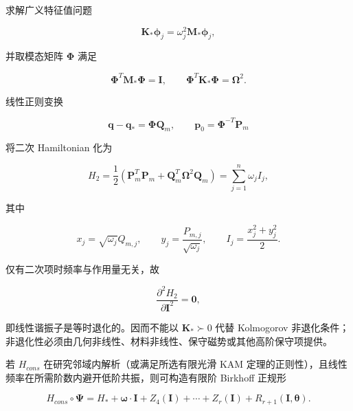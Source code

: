 求解广义特征值问题

\begin{equation}
\label{eq:hamiltonian-3-77}
\mathbf{K}_{*}\bm{\phi}_{j} = \omega_{j}^{2}\mathbf{M}_{*}\bm{\phi}_{j},
\end{equation}

并取模态矩阵 \(\bm{\Phi}\) 满足

\begin{equation}
\label{eq:hamiltonian-3-78}
\bm{\Phi}^{T}\mathbf{M}_{*}\bm{\Phi} = \mathbf{I},\quad\quad\bm{\Phi}^{T}\mathbf{K}_{*}\bm{\Phi} = \bm{\Omega}^{2}.
\end{equation}

线性正则变换

\begin{equation}
\label{eq:hamiltonian-3-79}
\mathbf{q} - \mathbf{q}_{*} = \bm{\Phi}\mathbf{Q}_{m},\quad\quad\mathbf{p}_{0} = \bm{\Phi}^{- T}\mathbf{P}_{m}
\end{equation}

将二次 Hamiltonian 化为

\begin{equation}
\label{eq:hamiltonian-3-80}
H_{2} = \frac{1}{2}\left( \mathbf{P}_{m}^{T}\mathbf{P}_{m} + \mathbf{Q}_{m}^{T}\bm{\Omega}^{2}\mathbf{Q}_{m} \right) = \sum_{j = 1}^{n}\omega_{j}I_{j},
\end{equation}

其中

\begin{equation}
\label{eq:hamiltonian-3-81}
x_{j} = \sqrt{\omega_{j}}Q_{m,j},\quad\quad y_{j} = \frac{P_{m,j}}{\sqrt{\omega_{j}}},\quad\quad I_{j} = \frac{x_{j}^{2} + y_{j}^{2}}{2}.
\end{equation}

仅有二次项时频率与作用量无关，故

\begin{equation}
\label{eq:hamiltonian-3-82}
\frac{\partial^{2}H_{2}}{\partial\mathbf{I}^{2}} = \mathbf{0},
\end{equation}

即线性谐振子是等时退化的。因而不能以 \(\mathbf{K}_{*} \succ 0\) 代替 Kolmogorov 非退化条件；非退化性必须由几何非线性、材料非线性、保守磁势或其他高阶保守项提供。

若 \(H_{cons}\) 在研究邻域内解析（或满足所选有限光滑 KAM 定理的正则性），且线性频率在所需阶数内避开低阶共振，则可构造有限阶 Birkhoff 正规形\cite{HairerLubichWanner2006GNI,FengQin2010,Arnold1989ClassicalMechanics}

\begin{equation}
\label{eq:hamiltonian-3-83}
H_{cons} \circ \bm{\Psi} = H_{*} + \bm{\omega} \cdot \mathbf{I} + Z_{4}\left( \mathbf{I} \right) + \cdots + Z_{r}\left( \mathbf{I} \right) + R_{r + 1}\left( \mathbf{I},\bm{\theta} \right).
\end{equation}

